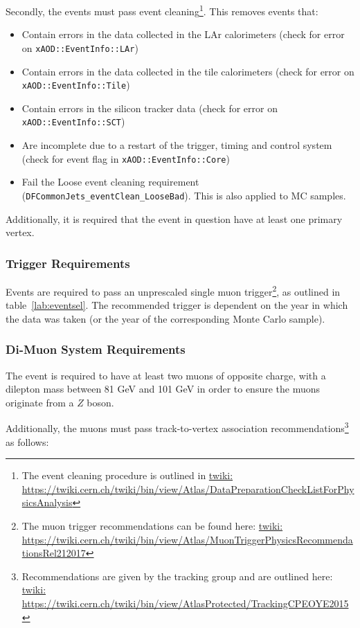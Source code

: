 Secondly, the events must pass event cleaning\footnote{The event cleaning procedure is outlined in \url{twiki: https://twiki.cern.ch/twiki/bin/view/Atlas/DataPreparationCheckListForPhysicsAnalysis}}. This removes events that:
\begin{itemize}
    \item Contain errors in the data collected in the LAr calorimeters (check for error on \texttt{xAOD::EventInfo::LAr})
    \item Contain errors in the data collected in the tile calorimeters (check for error on \texttt{xAOD::EventInfo::Tile})
    \item Contain errors in the silicon tracker data (check for error on \texttt{xAOD::EventInfo::SCT})
    \item Are incomplete due to a restart of the trigger, timing and control system (check for event flag in \texttt{xAOD::EventInfo::Core})
    \item Fail the Loose event cleaning requirement (\texttt{DFCommonJets\_eventClean\_LooseBad}). This is also applied to MC samples.
\end{itemize}

Additionally, it is required that the event in question have at least one primary vertex.

\subsubsection{Trigger Requirements}
\label{subsubsec:trigger}
Events are required to pass an unprescaled single muon trigger\footnote{The muon trigger recommendations can be found here: \url{twiki: https://twiki.cern.ch/twiki/bin/view/Atlas/MuonTriggerPhysicsRecommendationsRel212017}}, as outlined in table~\ref{lab:eventsel}.
The recommended trigger is dependent on the year in which the data was taken (or the year of the corresponding Monte Carlo sample).

\subsubsection{Di-Muon System Requirements}
\label{subsubsec:TTVA_selection}
The event is required to have at least two muons of opposite charge, with a dilepton mass between 81 GeV and 101 GeV in order to ensure the muons originate from a $Z$ boson.

Additionally, the muons must pass track-to-vertex association recommendations\footnote{Recommendations are given by the tracking group and are outlined here: \url{twiki: https://twiki.cern.ch/twiki/bin/view/AtlasProtected/TrackingCPEOYE2015}} as follows:

